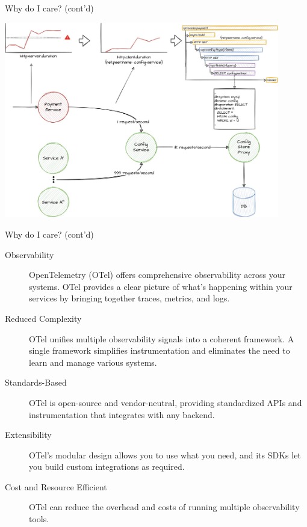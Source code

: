 \documentclass[aspectratio=169]{beamer}
\begin{document}
\begin{frame}{Why do I care? (cont'd)}
  \begin{center}
    \includegraphics[width=0.9\textwidth, height=0.9\textheight, keepaspectratio]{distributed-tracing.jpg}
  \end{center}
\end{frame}

\begin{frame}{Why do I care? (cont'd)}
  \begin{description}
    \item[Observability] OpenTelemetry (OTel) offers comprehensive observability
      across your systems. OTel provides a clear picture of what's happening
      within your services by bringing together traces, metrics, and logs.
    \item[Reduced Complexity] OTel unifies multiple observability signals into a
      coherent framework. A single framework simplifies instrumentation and
      eliminates the need to learn and manage various systems.
    \item[Standards-Based] OTel is open-source and vendor-neutral, providing
      standardized APIs and instrumentation that integrates with any backend.
    \item[Extensibility] OTel's modular design allows you to use what you need,
      and its SDKs let you build custom integrations as required.
    \item[Cost and Resource Efficient] OTel can reduce the overhead and costs of
      running multiple observability tools.
  \end{description}
\end{frame}
\end{document}
